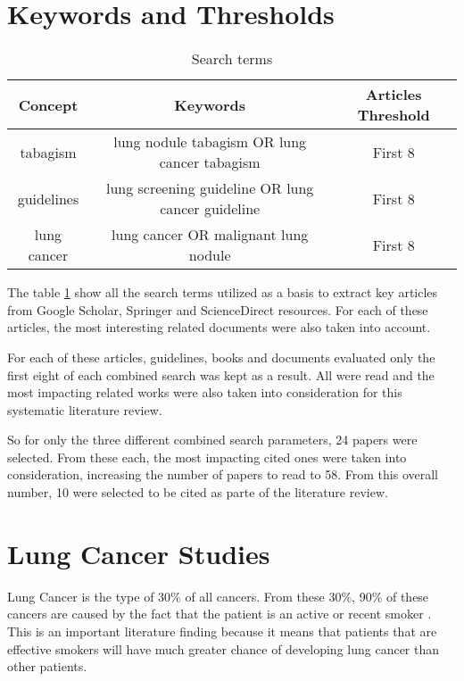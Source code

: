 \label{chap:literature_review}

\section{Keywords and Thresholds}
\begin{center}
\begin{table}

  \begin{tabular}{c|c|c}
    \hline 
    Concept & Keywords & Articles Threshold\tabularnewline
    \hline 
    tabagism & lung nodule tabagism OR lung cancer tabagism & First 8\tabularnewline
    guidelines & lung screening guideline OR lung cancer guideline & First 8\tabularnewline
    lung cancer & lung cancer OR malignant lung nodule & First 8\tabularnewline
    \hline 
  \end{tabular}
\par

\caption{\label{table:search_terms} Search terms}

\end{table}
\end{center}

The table \ref{table:search_terms} show all the search terms utilized as a basis to extract key articles from Google Scholar, Springer  and ScienceDirect resources. For each of these articles, the most interesting related documents were also taken into account.

For each of these articles, guidelines, books and documents evaluated only the first eight of each combined search was kept as a result. All were read and the most impacting related works were also taken into consideration for this systematic literature review.

So for only the three different combined search parameters, 24 papers were selected. From these each, the  most impacting cited ones were taken into consideration, increasing the number of papers to  read to 58. From this overall number, 10 were selected to be cited as parte of the literature review. %

\section{Lung Cancer Studies}

Lung Cancer is the type of 30\% of all cancers. From these 30\%, 90\% of these cancers are  caused by the fact that the patient is an active or recent smoker \cite{jaklitsch2012}\cite{nccn2019}\cite{roberts2013}. This is an important literature finding because it means that patients that are effective smokers will have much greater chance of developing lung cancer than other patients.

